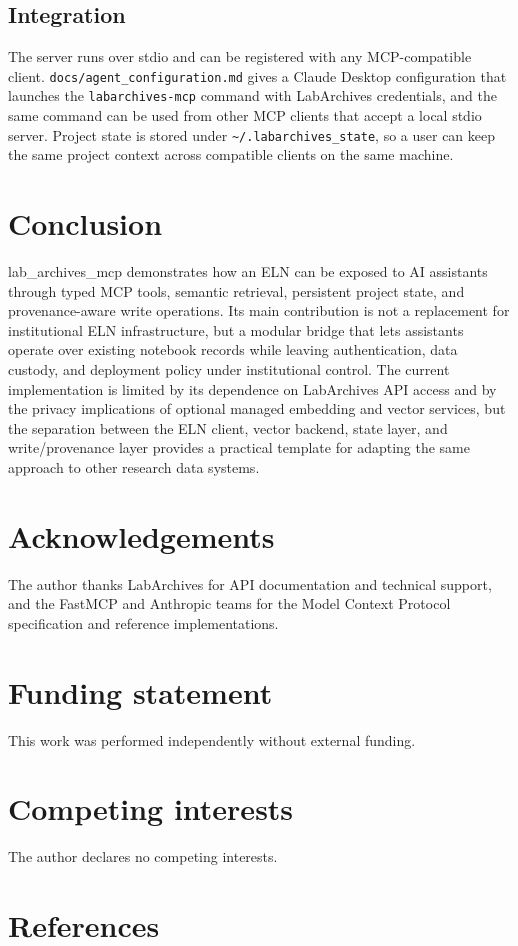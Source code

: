 \documentclass{josr}
\begin{document}
\subsection*{Integration}
The server runs over stdio and can be registered with any MCP-compatible client. \texttt{docs/agent\_configuration.md} gives a Claude Desktop configuration that launches the \texttt{labarchives-mcp} command with LabArchives credentials, and the same command can be used from other MCP clients that accept a local stdio server. Project state is stored under \texttt{\textasciitilde{}/.labarchives\_state}, so a user can keep the same project context across compatible clients on the same machine.

\section*{Conclusion}
lab\_archives\_mcp demonstrates how an ELN can be exposed to AI assistants through typed MCP tools, semantic retrieval, persistent project state, and provenance-aware write operations. Its main contribution is not a replacement for institutional ELN infrastructure, but a modular bridge that lets assistants operate over existing notebook records while leaving authentication, data custody, and deployment policy under institutional control. The current implementation is limited by its dependence on LabArchives API access and by the privacy implications of optional managed embedding and vector services, but the separation between the ELN client, vector backend, state layer, and write/provenance layer provides a practical template for adapting the same approach to other research data systems.

\section*{Acknowledgements}
The author thanks LabArchives for API documentation and technical support, and the FastMCP and Anthropic teams for the Model Context Protocol specification and reference implementations.

\section*{Funding statement}
This work was performed independently without external funding.

\section*{Competing interests}
The author declares no competing interests.

\section*{References}


\end{document}
